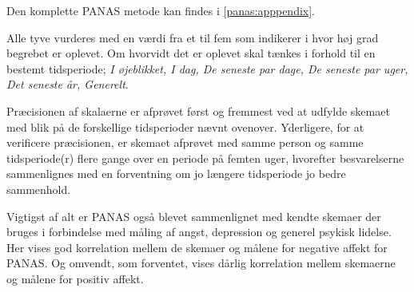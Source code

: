 Den komplette PANAS metode kan findes i \cref{panas:apppendix}.

Alle tyve vurderes med en værdi fra et til fem som indikerer i hvor høj grad begrebet er oplevet.
Om hvorvidt det er oplevet skal tænkes i forhold til en bestemt tidsperiode; \textit{I øjeblikket, I dag, De seneste par dage, De seneste par uger, Det seneste år, Generelt}.

Præcisionen af skalaerne er afprøvet først og fremmest ved at udfylde skemaet med blik på de forskellige tidsperioder nævnt ovenover.
Yderligere, for at verificere præcisionen, er skemaet afprøvet med samme person og samme tidsperiode(r) flere gange over en periode på femten uger, hvorefter besvarelserne sammenlignes med en forventning om jo længere tidsperiode jo bedre sammenhold.

Vigtigst af alt er PANAS også blevet sammenlignet med kendte skemaer der bruges i forbindelse med måling af angst, depression og generel psykisk lidelse.
Her vises god korrelation mellem de skemaer og målene for negative affekt for PANAS.
Og omvendt, som forventet, vises dårlig korrelation mellem skemaerne og målene for positiv affekt.